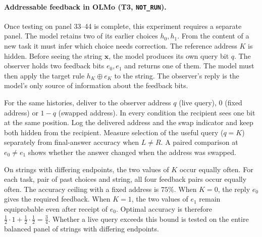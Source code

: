 \paragraph{Addressable feedback in OLMo (T3, \texttt{NOT\_RUN}).}
Once testing on panel 33--44 is complete, this experiment requires a separate panel. The model retains two of its earlier choices $h_0,h_1$. From the content of a new task it must infer which choice needs correction. The reference address $K$ is hidden. Before seeing the string $\mathbf{x}$, the model produces its own query bit $q$. The observer holds two feedback bits $e_0,e_1$ and returns one of them. The model must then apply the target rule $h_K\oplus e_K$ to the string. The observer's reply is the model's only source of information about the feedback bits.

For the same histories, deliver to the observer address $q$ (live query), $0$ (fixed address) or $1-q$ (swapped address). In every condition the recipient sees one bit at the same position. Log the delivered address and the swap indicator and keep both hidden from the recipient. Measure selection of the useful query ($q=K$) separately from final-answer accuracy when $L\ne R$. A paired comparison at $e_0\ne e_1$ shows whether the answer changed when the address was swapped.

On strings with differing endpoints, the two values of $K$ occur equally often. For each task, pair of past choices and string, all four feedback pairs occur equally often. The accuracy ceiling with a fixed address is $75\%$. When $K=0$, the reply $e_0$ gives the required feedback. When $K=1$, the two values of $e_1$ remain equiprobable even after receipt of $e_0$. Optimal accuracy is therefore $\tfrac12\cdot1+\tfrac12\cdot\tfrac12=\tfrac34$. Whether a live query exceeds this bound is tested on the entire balanced panel of strings with differing endpoints.

